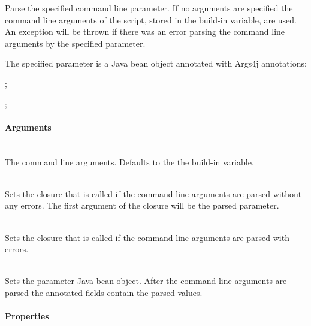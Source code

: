 %


Parse the specified command line parameter. If no 
arguments are specified the command line arguments of the script, stored in
the  build-in variable, are used.
An exception will be thrown if there was an error parsing the command line arguments
by the specified parameter.

The specified parameter is a Java bean object annotated with 
Args4j\cite{args4j13} annotations:
\begin{inparaitem}
\item {};
\item {};
\end{inparaitem}

\paragraph{Arguments}

\begin{asparadesc}
%
\item[\code{arguments: array|list}] \hfill \\
The command line arguments. Defaults to the the  build-in variable.
%
\item[\code{valid: closure}] \hfill \\
Sets the closure that is called if the command line arguments are parsed without
any errors. The first argument of the closure will be the parsed parameter.
%
\item[\code{notValid: closure}] \hfill \\
Sets the closure that is called if the command line arguments are parsed with
errors.
%
\item[\code{parameter}] \hfill \\
Sets the parameter Java bean object. After the command line arguments are parsed
the annotated fields contain the parsed values.
%
\end{asparadesc}

\paragraph{Properties}

